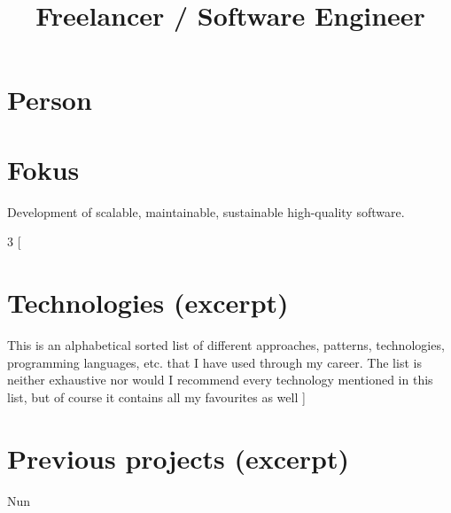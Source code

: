 \documentclass[12pt,a4paper]{moderncv}
\title{Freelancer / Software Engineer}
\begin{document}
\maketitle
\section{Person}


\section{Fokus}
Development of scalable, maintainable, sustainable high-quality software.



\newpage
\begin{multicols}{3}
[
\section{Technologies (excerpt)}
This is an alphabetical sorted list of different approaches, patterns, technologies, programming languages, etc. that I have used through my career.
The list is neither exhaustive nor would I recommend every technology mentioned in this list, but of course it contains all my favourites as well
]
\begin{itemize}


\end{itemize}
\end{multicols}


\section{Previous projects (excerpt)}
Nun
\end{document}
